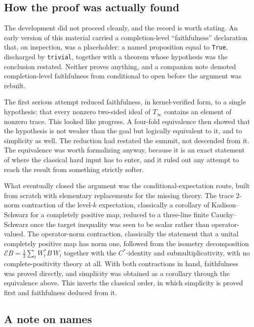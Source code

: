 \documentclass[11pt,reqno]{amsart}
\theoremstyle{plain}
\theoremstyle{definition}
\theoremstyle{remark}
\newcommand{\Tinf}{T_\infty}
\begin{document}
\subsection*{How the proof was actually found}

The development did not proceed cleanly, and the record is worth stating.
An early version of this material carried a completion-level
``faithfulness'' declaration that, on inspection, was a placeholder:
a named proposition equal to \texttt{True}, discharged by
\texttt{trivial}, together with a theorem whose hypothesis was the
conclusion restated. Neither proves anything, and a companion note demoted
completion-level faithfulness from conditional to open before the argument
was rebuilt.

The first serious attempt reduced faithfulness, in kernel-verified form, to
a single hypothesis: that every nonzero two-sided ideal of $\Tinf$ contains
an element of nonzero trace. This looked like progress. A four-fold
equivalence then showed that the hypothesis is not weaker than the goal but
logically equivalent to it, and to simplicity as well. The reduction had
restated the summit, not descended from it. The equivalence was worth
formalizing anyway, because it is an exact statement of where the classical
hard input has to enter, and it ruled out any attempt to reach the result
from something strictly softer.

What eventually closed the argument was the conditional-expectation route,
built from scratch with elementary replacements for the missing theory.
The trace $2$-norm contraction of the level-$k$ expectation, classically a
corollary of Kadison--Schwarz for a completely positive map, reduced to a
three-line finite Cauchy--Schwarz once the target inequality was seen to be
scalar rather than operator-valued. The operator-norm contraction,
classically the statement that a unital completely positive map has norm
one, followed from the isometry decomposition
$\mathcal{E}B = \tfrac{1}{3}\sum_t W_t^* B\, W_t$ together with the
$C^*$-identity and submultiplicativity, with no complete-positivity theory
at all. With both contractions in hand, faithfulness was proved directly,
and simplicity was obtained as a corollary through the equivalence above.
This inverts the classical order, in which simplicity is proved first and
faithfulness deduced from it.

\subsection*{A note on names}
\end{document}
